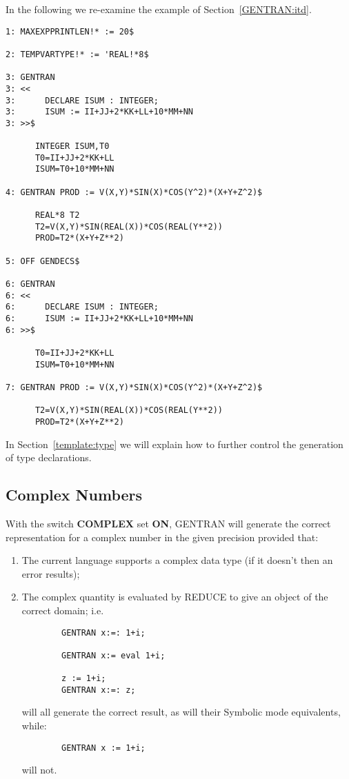 In the following we re-examine the example of Section~\ref{GENTRAN:itd}.
\begin{describe}{\example}
\begin{verbatim}
1: MAXEXPPRINTLEN!* := 20$ 

2: TEMPVARTYPE!* := 'REAL!*8$

3: GENTRAN 
3: << 
3:      DECLARE ISUM : INTEGER; 
3:      ISUM := II+JJ+2*KK+LL+10*MM+NN 
3: >>$ 

      INTEGER ISUM,T0
      T0=II+JJ+2*KK+LL
      ISUM=T0+10*MM+NN

4: GENTRAN PROD := V(X,Y)*SIN(X)*COS(Y^2)*(X+Y+Z^2)$ 

      REAL*8 T2
      T2=V(X,Y)*SIN(REAL(X))*COS(REAL(Y**2))
      PROD=T2*(X+Y+Z**2)

5: OFF GENDECS$ 

6: GENTRAN 
6: <<
6:      DECLARE ISUM : INTEGER; 
6:      ISUM := II+JJ+2*KK+LL+10*MM+NN 
6: >>$ 

      T0=II+JJ+2*KK+LL
      ISUM=T0+10*MM+NN

7: GENTRAN PROD := V(X,Y)*SIN(X)*COS(Y^2)*(X+Y+Z^2)$ 

      T2=V(X,Y)*SIN(REAL(X))*COS(REAL(Y**2))
      PROD=T2*(X+Y+Z**2)
\end{verbatim}
\end{describe}

In Section~\ref{template:type} we will explain how to further control
the generation of type declarations.

\subsection{Complex Numbers}
\label{complex}  
With the switch {\bf COMPLEX} set {\bf ON}, GENTRAN will generate the
correct representation for a complex number in the given precision
provided that:

\begin{enumerate}
\item The current language supports a complex data type (if it doesn't then
an error results);
\item The complex quantity is evaluated by REDUCE
to give an object of the correct
domain; i.e.
\begin{verbatim}
        GENTRAN x:=: 1+i;

        GENTRAN x:= eval 1+i;

        z := 1+i;
        GENTRAN x:=: z;
\end{verbatim}
will all generate the correct result, as will their Symbolic mode equivalents,
while:
\begin{verbatim}
        GENTRAN x := 1+i;
\end{verbatim}
will not.
\end{enumerate}

